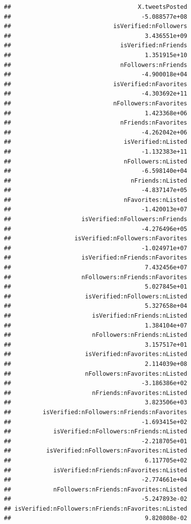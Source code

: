 \documentclass[
]{article}
\begin{document}
\begin{verbatim}
##                                    X.tweetsPosted 
##                                     -5.088577e+08 
##                             isVerified:nFollowers 
##                                      3.436551e+09 
##                               isVerified:nFriends 
##                                      1.351915e+10 
##                               nFollowers:nFriends 
##                                     -4.900018e+04 
##                             isVerified:nFavorites 
##                                     -4.303692e+11 
##                             nFollowers:nFavorites 
##                                      1.423368e+06 
##                               nFriends:nFavorites 
##                                     -4.262042e+06 
##                                isVerified:nListed 
##                                     -1.132383e+11 
##                                nFollowers:nListed 
##                                     -6.598140e+04 
##                                  nFriends:nListed 
##                                     -4.837147e+05 
##                                nFavorites:nListed 
##                                     -1.420013e+07 
##                    isVerified:nFollowers:nFriends 
##                                     -4.276496e+05 
##                  isVerified:nFollowers:nFavorites 
##                                     -1.024971e+07 
##                    isVerified:nFriends:nFavorites 
##                                      7.432456e+07 
##                    nFollowers:nFriends:nFavorites 
##                                      5.027845e+01 
##                     isVerified:nFollowers:nListed 
##                                      5.327658e+04 
##                       isVerified:nFriends:nListed 
##                                      1.384104e+07 
##                       nFollowers:nFriends:nListed 
##                                      3.157517e+01 
##                     isVerified:nFavorites:nListed 
##                                      2.114039e+08 
##                     nFollowers:nFavorites:nListed 
##                                     -3.186386e+02 
##                       nFriends:nFavorites:nListed 
##                                      3.823506e+03 
##         isVerified:nFollowers:nFriends:nFavorites 
##                                     -1.693415e+02 
##            isVerified:nFollowers:nFriends:nListed 
##                                     -2.218705e+01 
##          isVerified:nFollowers:nFavorites:nListed 
##                                      6.117705e+02 
##            isVerified:nFriends:nFavorites:nListed 
##                                     -2.774661e+04 
##            nFollowers:nFriends:nFavorites:nListed 
##                                     -5.247893e-02 
## isVerified:nFollowers:nFriends:nFavorites:nListed 
##                                      9.820808e-02
\end{verbatim}
\end{document}
